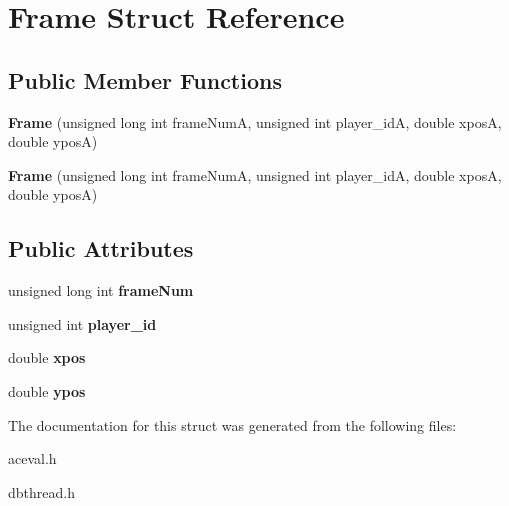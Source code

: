 \hypertarget{structFrame}{\section{Frame Struct Reference}
\label{structFrame}
}
\subsection*{Public Member Functions}
\begin{DoxyCompactItemize}
\item 
\hypertarget{structFrame_a9964f5818030ca16524acb68c3355696}{{\bfseries Frame} (unsigned long int frame\-Num\-A, unsigned int player\-\_\-id\-A, double xpos\-A, double ypos\-A)}\label{structFrame_a9964f5818030ca16524acb68c3355696}

\item 
\hypertarget{structFrame_a9964f5818030ca16524acb68c3355696}{{\bfseries Frame} (unsigned long int frame\-Num\-A, unsigned int player\-\_\-id\-A, double xpos\-A, double ypos\-A)}\label{structFrame_a9964f5818030ca16524acb68c3355696}

\end{DoxyCompactItemize}
\subsection*{Public Attributes}
\begin{DoxyCompactItemize}
\item 
\hypertarget{structFrame_a6e2a3b730bf084aa6e59acf9fc7cab45}{unsigned long int {\bfseries frame\-Num}}\label{structFrame_a6e2a3b730bf084aa6e59acf9fc7cab45}

\item 
\hypertarget{structFrame_a7f7492c8ed7d6e932fe1161d04d73f2d}{unsigned int {\bfseries player\-\_\-id}}\label{structFrame_a7f7492c8ed7d6e932fe1161d04d73f2d}

\item 
\hypertarget{structFrame_a695df9509f1f1e67e3a1dbe45aec247c}{double {\bfseries xpos}}\label{structFrame_a695df9509f1f1e67e3a1dbe45aec247c}

\item 
\hypertarget{structFrame_ae37df21b384dd84305dfeea5bb60cfd5}{double {\bfseries ypos}}\label{structFrame_ae37df21b384dd84305dfeea5bb60cfd5}

\end{DoxyCompactItemize}


The documentation for this struct was generated from the following files\-:\begin{DoxyCompactItemize}
\item 
aceval.\-h\item 
dbthread.\-h\end{DoxyCompactItemize}
